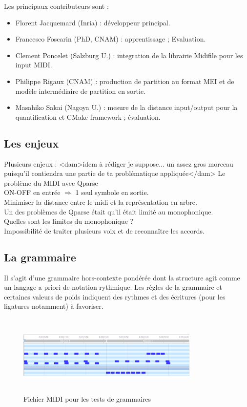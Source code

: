 Les principaux contributeurs sont :
\begin{itemize}
	\item Florent Jacquemard (Inria) : développeur principal.
	\item Francesco Foscarin (PhD, CNAM) : apprentissage ; Evaluation.
	\item Clement Poncelet (Salzburg U.) : integration de la librairie Midifile
        pour les input MIDI.
	\item Philippe Rigaux (CNAM) : production de partition au format MEI et de
        modèle intermédiaire de partition en sortie.
	\item Masahiko Sakai (Nagoya U.) : mesure de la distance input/output pour
        la quantification et CMake framework ; évaluation.
\end{itemize}

\subsection*{Les enjeux}
Plusieurs enjeux : <dam>idem à rédiger je suppose... un assez gros morceau
puisqu'il contiendra une partie de ta problématique appliquée</dam>
Le problème du MIDI avec Qparse\\
ON-OFF en entrée $\Rightarrow$ 1 seul symbole en sortie.\\
Minimiser la distance entre le midi et la représentation en arbre.\\
Un des problèmes de Qparse était qu’il était limité au monophonique.\\
Quelles sont les limites du monophonique ?\\
Impossibilité de traiter plusieurs voix et de reconnaître les accords.

\subsection*{La grammaire}
Il s’agit d’une grammaire hors-contexte pondérée dont la structure agit comme
un langage a priori de notation rythmique. Les règles de la grammaire et
certaines valeurs de poids indiquent des rythmes et des écritures (pour les
ligatures notamment) à favoriser.\\

\begin{figure}[h]
    \centering
    \includegraphics[height=40mm, width=90mm]{
    z_images/4_experimentations/3_developpement/0_midi_2bars_fill.png}
    \caption{Fichier MIDI pour les tests de grammaires}
    \label{midi_gram}
\end{figure}

